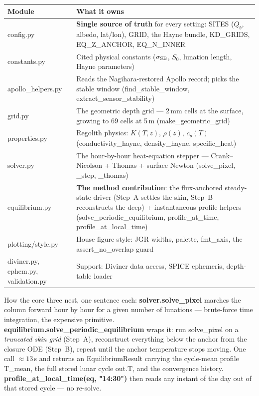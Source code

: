 \documentclass[11pt]{article}
\newcommand{\code}[1]{{\ttfamily\small #1}}
\begin{document}
\begin{center}\small
\begin{tabularx}{\textwidth}{@{}>{\ttfamily\small}l X@{}}
\toprule
\textnormal{\textbf{Module}} & \textbf{What it owns} \\
\midrule
config.py & \textnormal{\textbf{Single source of truth}} for every setting: \code{SITES} ($Q_b$, albedo, lat/lon), \code{GRID}, the Hayne bundle, \code{KD\_GRIDS}, \code{EQ\_Z\_ANCHOR}, \code{EQ\_N\_INNER} \\
constants.py & Cited physical constants ($\sigma_{\rm SB}$, $S_0$, lunation length, Hayne parameters) \\
apollo\_helpers.py & Reads the Nagihara-restored Apollo record; picks the stable window (\code{find\_stable\_window}, \code{extract\_sensor\_stability}) \\
grid.py & The geometric depth grid --- 2\,mm cells at the surface, growing to 69 cells at 5\,m (\code{make\_geometric\_grid}) \\
properties.py & Regolith physics: $K(T,z)$, $\rho(z)$, $c_p(T)$ (\code{conductivity\_hayne}, \code{density\_hayne}, \code{specific\_heat}) \\
solver.py & The hour-by-hour heat-equation stepper --- Crank--Nicolson + Thomas + surface Newton (\code{solve\_pixel}, \code{\_step}, \code{\_thomas}) \\
equilibrium.py & \textnormal{\textbf{The method contribution}}: the flux-anchored steady-state driver (Step~A settles the skin, Step~B reconstructs the deep) + instantaneous-profile helpers (\code{solve\_periodic\_equilibrium}, \code{profile\_at\_time}, \code{profile\_at\_local\_time}) \\
plotting/style.py & House figure style: JGR widths, palette, \code{fmt\_axis}, the \code{assert\_no\_overlap} guard \\
diviner.py, ephem.py, validation.py & Support: Diviner data access, SPICE ephemeris, depth-table loader \\
\bottomrule
\end{tabularx}
\end{center}

How the core three nest, one sentence each: \textbf{\code{solver.solve\_pixel}}
marches the column forward hour by hour for a given number of lunations ---
brute-force time integration, the expensive primitive. \textbf{\code{equilibrium.solve\_periodic\_equilibrium}}
wraps it: run \code{solve\_pixel} on a \emph{truncated skin grid} (Step~A),
reconstruct everything below the anchor from the closure ODE (Step~B), repeat
until the anchor temperature stops moving. One call $\approx 13$\,s and
returns an \code{EquilibriumResult} carrying the cycle-mean profile
\code{T\_mean}, the full stored lunar cycle \code{out.T}, and the convergence
\code{history}. \textbf{\code{profile\_at\_local\_time(eq, "14:30")}} then
reads any instant of the day out of that stored cycle --- no re-solve.
\end{document}

